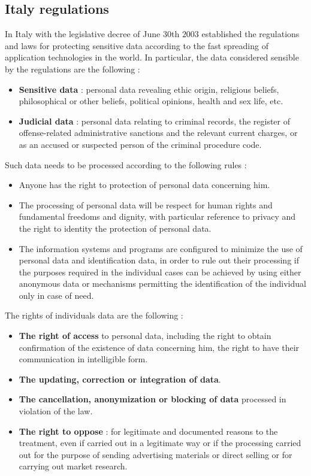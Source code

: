 \subsection{Italy regulations}
In Italy with the legislative decree of June $30$th $2003$ established the regulations and laws for protecting sensitive data according to the fast spreading of application technologies in the world. In particular, the data considered sensible by the regulations are the following :
\begin{itemize}
\item \textbf{Sensitive data} : personal data revealing ethic origin, religious beliefs, philosophical or other beliefs, political opinions, health and sex life, etc.
\item \textbf{Judicial data} : personal data relating to criminal records, the register of offense-related administrative sanctions and the relevant current charges, or as an accused or suspected person of the criminal procedure code.
\end{itemize}
Such data needs to be processed according to the following rules :
\begin{itemize}
\item Anyone has the right to protection of personal data concerning him.
\item The processing of personal data will be respect for human rights and fundamental freedoms and dignity, with particular reference to privacy and the right to identity the protection of personal data.
\item The information systems and programs are configured to minimize the use of personal data and identification data, in order to rule out their processing if the purposes required in the individual cases can be achieved by using either anonymous data or mechanisms permitting the identification of the individual only in case of need.
\end{itemize}
The rights of individuals data are the following :
\begin{itemize}
\item \textbf{The right of access} to personal data, including the right to obtain confirmation of the existence of data concerning him, the right to have their communication in intelligible form.
\item \textbf{The updating, correction or integration of data}.
\item \textbf{The cancellation, anonymization or blocking of data} processed in violation of the law.
\item \textbf{The right to oppose} : for legitimate and documented reasons to the treatment, even if carried out in a legitimate way or if the processing carried out for the purpose of sending advertising materials or direct selling or for carrying out market research. 
\end{itemize}

